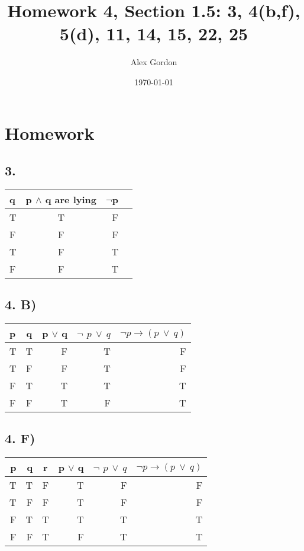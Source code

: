 \documentclass[12]{scrartcl}
\begin{document}
\title{Homework 4, Section 1.5: 3, 4(b,f), 5(d), 11, 14, 15, 22, 25}
\author{Alex Gordon}
\date{\today}
\maketitle
\section*{Homework}
\subsection*{3.}
\begin{tabular}{ l | c || r || r ||}
q & p $\wedge$ q are lying &$\neg$p \\
  \hline                        
  T & T & F\\
  F & F & F\\
  T & F & T\\
  F & F & T\\
  \hline  
\end{tabular}
\subsection*{4. B)}
\begin{tabular}{| l | c || r | r | r ||}
p & q & p $\vee$ q &$\neg$ $p \ \vee \ q$ &$\neg p \rightarrow (p\ \vee  \ q)$ \\
  \hline                        
  T & T & F & T & F\\
  T & F & F & T & F\\
  F & T & T & T & T\\
  F & F & T & F & T\\
  \hline  
\end{tabular}
\subsection*{4. F)}
\begin{tabular}{ | r | r | c || r | r | r ||}
p & q & r & p $\vee$ q &$\neg$ $p \ \vee \ q$ &$\neg p \rightarrow (p\ \vee  \ q)$ \\
  \hline                        
  T & T & F & T & F & F\\
  T & F & F & T & F & F\\
  F & T & T & T & T & T\\
  F & F & T & F & T & T\\
  \hline  
\end{tabular}
\end{document}
